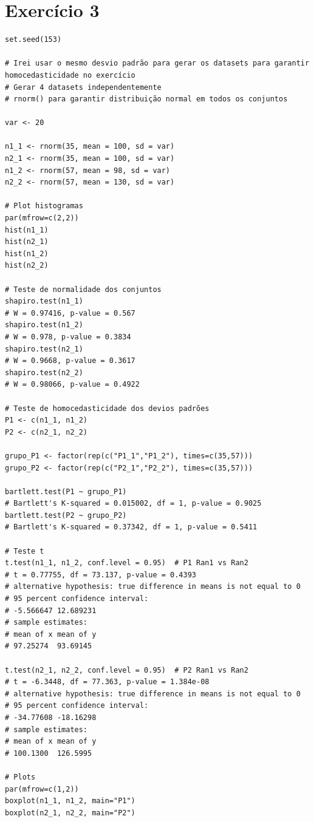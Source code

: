 \documentclass{article}
\begin{document}
\section{Exercício 3}

\begin{lstlisting}
set.seed(153)

# Irei usar o mesmo desvio padrão para gerar os datasets para garantir homocedasticidade no exercício
# Gerar 4 datasets independentemente
# rnorm() para garantir distribuição normal em todos os conjuntos

var <- 20

n1_1 <- rnorm(35, mean = 100, sd = var)
n2_1 <- rnorm(35, mean = 100, sd = var)
n1_2 <- rnorm(57, mean = 98, sd = var)
n2_2 <- rnorm(57, mean = 130, sd = var)

# Plot histogramas
par(mfrow=c(2,2))
hist(n1_1)
hist(n2_1)
hist(n1_2)
hist(n2_2)

# Teste de normalidade dos conjuntos
shapiro.test(n1_1)
# W = 0.97416, p-value = 0.567
shapiro.test(n1_2)
# W = 0.978, p-value = 0.3834
shapiro.test(n2_1)
# W = 0.9668, p-value = 0.3617
shapiro.test(n2_2)
# W = 0.98066, p-value = 0.4922

# Teste de homocedasticidade dos devios padrões
P1 <- c(n1_1, n1_2)
P2 <- c(n2_1, n2_2)

grupo_P1 <- factor(rep(c("P1_1","P1_2"), times=c(35,57)))
grupo_P2 <- factor(rep(c("P2_1","P2_2"), times=c(35,57)))

bartlett.test(P1 ~ grupo_P1)
# Bartlett's K-squared = 0.015002, df = 1, p-value = 0.9025
bartlett.test(P2 ~ grupo_P2)
# Bartlett's K-squared = 0.37342, df = 1, p-value = 0.5411

# Teste t
t.test(n1_1, n1_2, conf.level = 0.95)  # P1 Ran1 vs Ran2
# t = 0.77755, df = 73.137, p-value = 0.4393
# alternative hypothesis: true difference in means is not equal to 0
# 95 percent confidence interval:
# -5.566647 12.689231
# sample estimates:
# mean of x mean of y 
# 97.25274  93.69145

t.test(n2_1, n2_2, conf.level = 0.95)  # P2 Ran1 vs Ran2
# t = -6.3448, df = 77.363, p-value = 1.384e-08
# alternative hypothesis: true difference in means is not equal to 0
# 95 percent confidence interval:
# -34.77608 -18.16298
# sample estimates:
# mean of x mean of y 
# 100.1300  126.5995

# Plots
par(mfrow=c(1,2))
boxplot(n1_1, n1_2, main="P1")
boxplot(n2_1, n2_2, main="P2")
\end{lstlisting}
\end{document}

